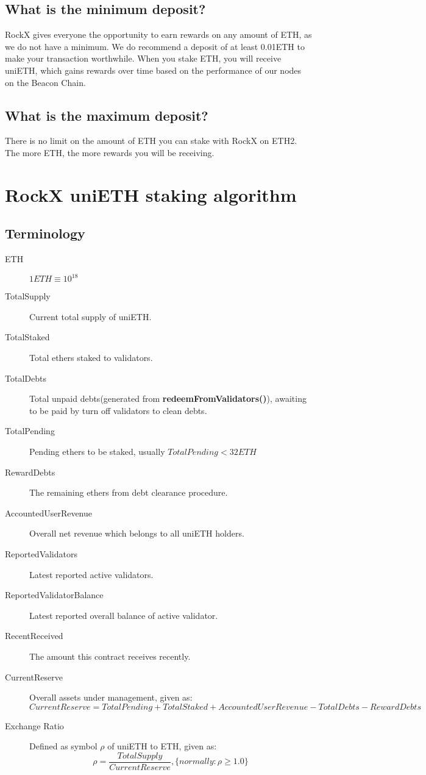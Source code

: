 \documentclass{article}
\begin{document}
\subsection{What is the minimum deposit?}
RockX gives everyone the opportunity to earn rewards on any amount of ETH, as we do not have a minimum. We do recommend a deposit of at least 0.01ETH to make your transaction worthwhile. When you stake ETH, you will receive uniETH, which gains rewards over time based on the performance of our nodes on the Beacon Chain.

\subsection{What is the maximum deposit?}
There is no limit on the amount of ETH you can stake with RockX on ETH2. The more ETH, the more rewards you will be receiving.

\section{RockX uniETH staking algorithm}

\subsection{Terminology}
\begin{description}
   \item[ETH] $1 ETH \equiv 10^{18}$
   \item[TotalSupply] Current total supply of uniETH.
   \item[TotalStaked] Total ethers staked to validators.
   \item[TotalDebts] Total unpaid debts(generated from \textbf{redeemFromValidators()}), awaiting to be paid by turn off validators to clean debts.
   \item[TotalPending] Pending ethers to be staked, usually $TotalPending <32ETH$
   \item[RewardDebts] The remaining ethers from debt clearance procedure.
   \item[AccountedUserRevenue] Overall net revenue which belongs to all uniETH holders.
   \item[ReportedValidators] Latest reported active validators.
   \item[ReportedValidatorBalance] Latest reported overall balance of active validator.
   \item[RecentReceived] The amount this contract receives recently.
   \item[CurrentReserve] Overall assets under management, given as:
   \[CurrentReserve = TotalPending + TotalStaked + AccountedUserRevenue - TotalDebts - RewardDebts\]
   \item[Exchange Ratio] Defined as symbol $\rho$ of uniETH to ETH, given as: 
    \[\rho = \frac{TotalSupply}{CurrentReserve} , \{normally: \rho \geq 1.0\} \]
\end{description}
\end{document}
